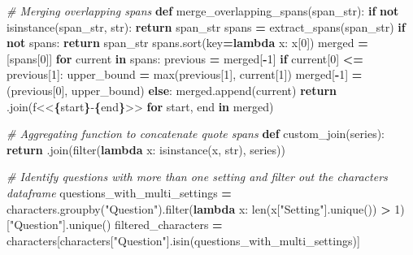 \documentclass[
]{article}
\newenvironment{Shaded}{\begin{snugshade}}{\end{snugshade}}
\newcommand{\BuiltInTok}[1]{#1}
\newcommand{\CommentTok}[1]{\textcolor[rgb]{0.56,0.35,0.01}{\textit{#1}}}
\newcommand{\ControlFlowTok}[1]{\textcolor[rgb]{0.13,0.29,0.53}{\textbf{#1}}}
\newcommand{\DecValTok}[1]{\textcolor[rgb]{0.00,0.00,0.81}{#1}}
\newcommand{\KeywordTok}[1]{\textcolor[rgb]{0.13,0.29,0.53}{\textbf{#1}}}
\newcommand{\NormalTok}[1]{#1}
\newcommand{\OperatorTok}[1]{\textcolor[rgb]{0.81,0.36,0.00}{\textbf{#1}}}
\newcommand{\SpecialCharTok}[1]{\textcolor[rgb]{0.81,0.36,0.00}{\textbf{#1}}}
\newcommand{\SpecialStringTok}[1]{\textcolor[rgb]{0.31,0.60,0.02}{#1}}
\newcommand{\StringTok}[1]{\textcolor[rgb]{0.31,0.60,0.02}{#1}}
\begin{document}
\begin{Shaded}
\begin{Highlighting}[]
\CommentTok{\# Merging overlapping spans}
\KeywordTok{def}\NormalTok{ merge\_overlapping\_spans(span\_str):}
    \ControlFlowTok{if} \KeywordTok{not} \BuiltInTok{isinstance}\NormalTok{(span\_str, }\BuiltInTok{str}\NormalTok{):}
        \ControlFlowTok{return}\NormalTok{ span\_str}
\NormalTok{    spans }\OperatorTok{=}\NormalTok{ extract\_spans(span\_str)}
    \ControlFlowTok{if} \KeywordTok{not}\NormalTok{ spans:}
        \ControlFlowTok{return}\NormalTok{ span\_str}
\NormalTok{    spans.sort(key}\OperatorTok{=}\KeywordTok{lambda}\NormalTok{ x: x[}\DecValTok{0}\NormalTok{])}
\NormalTok{    merged }\OperatorTok{=}\NormalTok{ [spans[}\DecValTok{0}\NormalTok{]]}
    \ControlFlowTok{for}\NormalTok{ current }\KeywordTok{in}\NormalTok{ spans:}
\NormalTok{        previous }\OperatorTok{=}\NormalTok{ merged[}\OperatorTok{{-}}\DecValTok{1}\NormalTok{]}
        \ControlFlowTok{if}\NormalTok{ current[}\DecValTok{0}\NormalTok{] }\OperatorTok{\textless{}=}\NormalTok{ previous[}\DecValTok{1}\NormalTok{]:}
\NormalTok{            upper\_bound }\OperatorTok{=} \BuiltInTok{max}\NormalTok{(previous[}\DecValTok{1}\NormalTok{], current[}\DecValTok{1}\NormalTok{])}
\NormalTok{            merged[}\OperatorTok{{-}}\DecValTok{1}\NormalTok{] }\OperatorTok{=}\NormalTok{ (previous[}\DecValTok{0}\NormalTok{], upper\_bound)}
        \ControlFlowTok{else}\NormalTok{:}
\NormalTok{            merged.append(current)}
    \ControlFlowTok{return} \StringTok{\textquotesingle{} \textquotesingle{}}\NormalTok{.join(}\SpecialStringTok{f\textquotesingle{}\textless{}\textless{}}\SpecialCharTok{\{}\NormalTok{start}\SpecialCharTok{\}}\SpecialStringTok{{-}}\SpecialCharTok{\{}\NormalTok{end}\SpecialCharTok{\}}\SpecialStringTok{\textgreater{}\textgreater{}\textquotesingle{}} \ControlFlowTok{for}\NormalTok{ start, end }\KeywordTok{in}\NormalTok{ merged)}

\CommentTok{\# Aggregating function to concatenate quote spans}
\KeywordTok{def}\NormalTok{ custom\_join(series):}
    \ControlFlowTok{return} \StringTok{\textquotesingle{} \textquotesingle{}}\NormalTok{.join(}\BuiltInTok{filter}\NormalTok{(}\KeywordTok{lambda}\NormalTok{ x: }\BuiltInTok{isinstance}\NormalTok{(x, }\BuiltInTok{str}\NormalTok{), series))}

\CommentTok{\# Identify questions with more than one setting and filter out the characters dataframe}
\NormalTok{questions\_with\_multi\_settings }\OperatorTok{=}\NormalTok{ characters.groupby(}\StringTok{"Question"}\NormalTok{).}\BuiltInTok{filter}\NormalTok{(}\KeywordTok{lambda}\NormalTok{ x: }\BuiltInTok{len}\NormalTok{(x[}\StringTok{"Setting"}\NormalTok{].unique()) }\OperatorTok{\textgreater{}} \DecValTok{1}\NormalTok{)[}\StringTok{"Question"}\NormalTok{].unique()}
\NormalTok{filtered\_characters }\OperatorTok{=}\NormalTok{ characters[characters[}\StringTok{"Question"}\NormalTok{].isin(questions\_with\_multi\_settings)]}


\end{Highlighting}
\end{Shaded}
\end{document}
